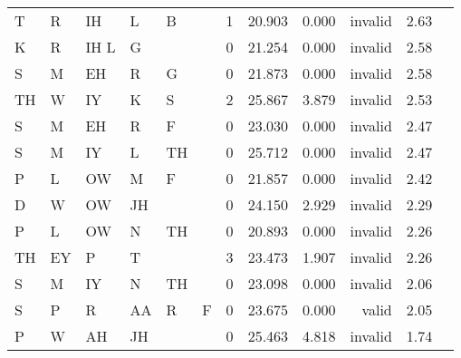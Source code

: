 \begin{longtable}{l@{ } l@{ } l@{ } l@{ } l@{ } l r r r r r r}
T & R & IH & L & B &   & 1 & 20.903 & 0.000 & invalid & 2.63 \\
K & R & IH L & G &   &   & 0 & 21.254 & 0.000 & invalid & 2.58 \\
S & M & EH & R & G &   & 0 & 21.873 & 0.000 & invalid & 2.58 \\
TH & W & IY & K & S &   & 2 & 25.867 & 3.879 & invalid & 2.53 \\
S & M & EH & R & F &   & 0 & 23.030 & 0.000 & invalid & 2.47 \\
S & M & IY & L & TH &   & 0 & 25.712 & 0.000 & invalid & 2.47 \\
P & L & OW & M & F &   & 0 & 21.857 & 0.000 & invalid & 2.42 \\
D & W & OW & JH &   &   & 0 & 24.150 & 2.929 & invalid & 2.29 \\
P & L & OW & N & TH &   & 0 & 20.893 & 0.000 & invalid & 2.26 \\
TH & EY & P & T &   &   & 3 & 23.473 & 1.907 & invalid & 2.26 \\
S & M & IY & N & TH &   & 0 & 23.098 & 0.000 & invalid & 2.06 \\
S & P & R & AA & R & F & 0 & 23.675 & 0.000 & valid & 2.05 \\
P & W & AH & JH &   &   & 0 & 25.463 & 4.818 & invalid & 1.74 \\
\bottomrule
\end{longtable}
